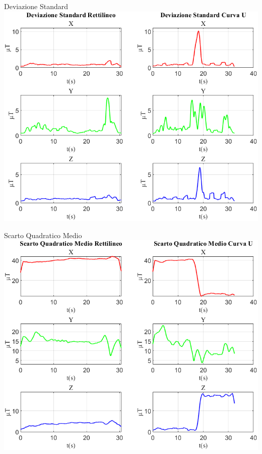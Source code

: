 \documentclass[beamer]{standalone}
\begin{document}
	\begin{frame}{{Deviazione Standard}}
		\centering\includegraphics[height=.8\textheight]{figure/Mag/Deviazione Standard}
	\end{frame}
	
	\begin{frame}{{Scarto Quadratico Medio}}
		\centering\includegraphics[height=.8\textheight]{figure/Mag/Scarto Quadratico Medio}
	\end{frame}
	
\end{document}
